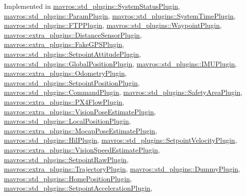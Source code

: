 Implemented in \mbox{\hyperlink{group__plugin_gac4e5bdd397cd4f4d5a68a086879ad42e}{mavros\+::std\+\_\+plugins\+::\+System\+Status\+Plugin}}, \mbox{\hyperlink{group__plugin_gac1471c7f06987a6ca0b199634a80f22b}{mavros\+::std\+\_\+plugins\+::\+Param\+Plugin}}, \mbox{\hyperlink{group__plugin_gab01303b0702a925da36b38cb1d1a1d45}{mavros\+::std\+\_\+plugins\+::\+System\+Time\+Plugin}}, \mbox{\hyperlink{group__plugin_ga75b1dc5d6bd1dc976c4a974b93d03e92}{mavros\+::std\+\_\+plugins\+::\+F\+T\+P\+Plugin}}, \mbox{\hyperlink{group__plugin_ga27f42c57511291aaaf46e268e4833ed2}{mavros\+::std\+\_\+plugins\+::\+Waypoint\+Plugin}}, \mbox{\hyperlink{group__plugin_gafe36c8c7308353863b1a33f4ca497159}{mavros\+::extra\+\_\+plugins\+::\+Distance\+Sensor\+Plugin}}, \mbox{\hyperlink{group__plugin_ga19cf673f75e3612d3e8d7b2cd316165e}{mavros\+::extra\+\_\+plugins\+::\+Fake\+G\+P\+S\+Plugin}}, \mbox{\hyperlink{group__plugin_ga41b8d12774fb380cb28817f5adec25e5}{mavros\+::std\+\_\+plugins\+::\+Setpoint\+Attitude\+Plugin}}, \mbox{\hyperlink{group__plugin_ga0dfa5c046201515b43ef6e843b74c89a}{mavros\+::std\+\_\+plugins\+::\+Global\+Position\+Plugin}}, \mbox{\hyperlink{group__plugin_ga380625ad9d721e273b204b1b74724e40}{mavros\+::std\+\_\+plugins\+::\+I\+M\+U\+Plugin}}, \mbox{\hyperlink{group__plugin_ga67f0c200b8288b38f454aadd9ea68710}{mavros\+::extra\+\_\+plugins\+::\+Odometry\+Plugin}}, \mbox{\hyperlink{group__plugin_ga99aff69e854142f0373ec4acb5ac726d}{mavros\+::std\+\_\+plugins\+::\+Setpoint\+Position\+Plugin}}, \mbox{\hyperlink{group__plugin_ga359b17302f8aac303c17013d6fe7ea7f}{mavros\+::std\+\_\+plugins\+::\+Command\+Plugin}}, \mbox{\hyperlink{group__plugin_gade85cfda6dd25076ce1a72955806fe45}{mavros\+::std\+\_\+plugins\+::\+Safety\+Area\+Plugin}}, \mbox{\hyperlink{group__plugin_ga70d7cb3f7611e394d7a0d85ca5e2dcf5}{mavros\+::extra\+\_\+plugins\+::\+P\+X4\+Flow\+Plugin}}, \mbox{\hyperlink{group__plugin_ga89567b4d29bc8a805270e131c89fab3d}{mavros\+::extra\+\_\+plugins\+::\+Vision\+Pose\+Estimate\+Plugin}}, \mbox{\hyperlink{group__plugin_ga45d714bacb570023793b00c91a7695af}{mavros\+::std\+\_\+plugins\+::\+Local\+Position\+Plugin}}, \mbox{\hyperlink{group__plugin_gad79e8a39bc49a479f78b9222cc7cc68a}{mavros\+::extra\+\_\+plugins\+::\+Mocap\+Pose\+Estimate\+Plugin}}, \mbox{\hyperlink{group__plugin_ga393b7527b376fb0e4706ac4f3d9298a3}{mavros\+::std\+\_\+plugins\+::\+Hil\+Plugin}}, \mbox{\hyperlink{group__plugin_ga63aa4be791ca2a5877ac7a1a6f4e881e}{mavros\+::std\+\_\+plugins\+::\+Setpoint\+Velocity\+Plugin}}, \mbox{\hyperlink{group__plugin_gaf84b1b053a36a50e34346d397033dada}{mavros\+::extra\+\_\+plugins\+::\+Vision\+Speed\+Estimate\+Plugin}}, \mbox{\hyperlink{group__plugin_ga7010ce8f4de96dae39a8dd9a0de4246e}{mavros\+::std\+\_\+plugins\+::\+Setpoint\+Raw\+Plugin}}, \mbox{\hyperlink{group__plugin_gaae780d771bd0792a591dc341783cf8de}{mavros\+::extra\+\_\+plugins\+::\+Trajectory\+Plugin}}, \mbox{\hyperlink{group__plugin_gaf24dcc35ae67b2e6842effce1e9c3803}{mavros\+::std\+\_\+plugins\+::\+Dummy\+Plugin}}, \mbox{\hyperlink{group__plugin_ga09ac4c0f6994b81c5e7f5b072f71e7d2}{mavros\+::std\+\_\+plugins\+::\+Home\+Position\+Plugin}}, \mbox{\hyperlink{group__plugin_ga07ccc1eddfa34ce64d9d61c1255ace1c}{mavros\+::std\+\_\+plugins\+::\+Setpoint\+Acceleration\+Plugin}}, 